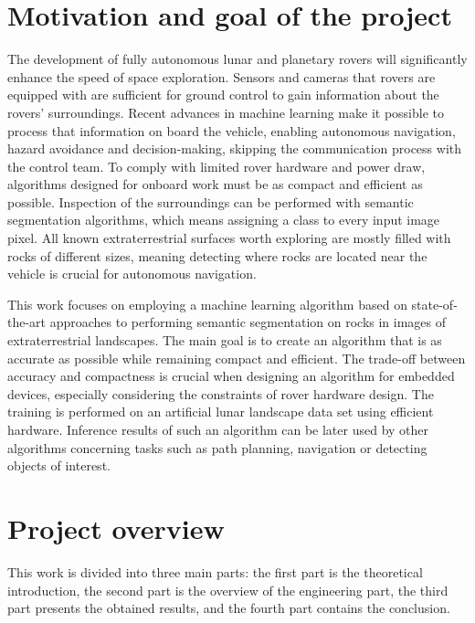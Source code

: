 \documentclass[a4paper,twoside,12pt]{book}
\begin{document}
\section{Motivation and goal of the project}
The development of fully autonomous lunar and planetary rovers will significantly enhance the speed of space exploration. Sensors and cameras that rovers are equipped with are sufficient for ground control to gain information about the rovers' surroundings. Recent advances in machine learning make it possible to process that information on board the vehicle, enabling autonomous navigation, hazard avoidance and decision-making, skipping the communication process with the control team. To comply with limited rover hardware and power draw, algorithms designed for onboard work must be as compact and efficient as possible. Inspection of the surroundings can be performed with semantic segmentation algorithms, which means assigning a class to every input image pixel. All known extraterrestrial surfaces worth exploring are mostly filled with rocks of different sizes, meaning detecting where rocks are located near the vehicle is crucial for autonomous navigation.

This work focuses on employing a machine learning algorithm based on state-of-the-art approaches to performing semantic segmentation on rocks in images of extraterrestrial landscapes. The main goal is to create an algorithm that is as accurate as possible while remaining compact and efficient. The trade-off between accuracy and compactness is crucial when designing an algorithm for embedded devices, especially considering the constraints of rover hardware design. The training is performed on an artificial lunar landscape data set using efficient hardware. Inference results of such an algorithm can be later used by other algorithms concerning tasks such as path planning, navigation or detecting objects of interest.

\section{Project overview}
This work is divided into three main parts: the first part is the theoretical introduction, the second part is the overview of the engineering part, the third part presents the obtained results, and the fourth part contains the conclusion.
\end{document}
